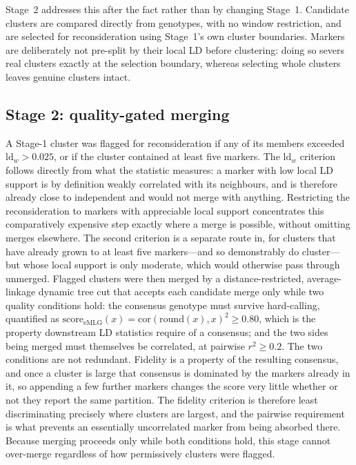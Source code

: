 \documentclass[11pt]{article}
\newcommand{\rsq}{\ensuremath{r^{2}}}
\begin{document}
Stage~2 addresses this after the fact rather than by changing Stage~1. Candidate
clusters are compared directly from genotypes, with no window restriction, and
are selected for reconsideration using Stage~1's own cluster boundaries. Markers
are deliberately not pre-split by their local LD before clustering: doing so
severs real clusters exactly at the selection boundary, whereas selecting whole
clusters leaves genuine clusters intact.

\subsection{Stage 2: quality-gated merging}
A Stage-1 cluster was flagged for reconsideration if any of its members exceeded
$\mathrm{ld}_w > 0.025$, or if the cluster contained at least five markers. The
$\mathrm{ld}_w$ criterion follows directly from what the statistic measures: a
marker with low local LD support is by definition weakly correlated with its
neighbours, and is therefore already close to independent and would not merge
with anything. Restricting the reconsideration to markers with appreciable local
support concentrates this comparatively expensive step exactly where a merge is
possible, without omitting merges elsewhere. The second criterion is a separate
route in, for clusters that have already grown to at least five markers---and so
demonstrably do cluster---but whose local support is only moderate, which would
otherwise pass through unmerged. Flagged clusters were
then merged by a distance-restricted, average-linkage dynamic tree cut that
accepts each candidate merge only while two quality conditions hold: the
consensus genotype must survive hard-calling, quantified as
$\mathrm{score}_{\mathrm{eMLG}}(x) = \mathrm{cor}(\mathrm{round}(x),x)^2 \ge
0.80$, which is the property downstream LD statistics require of a consensus;
and the two sides being merged must themselves be correlated, at pairwise
$\rsq \ge 0.2$. The two conditions are not redundant. Fidelity is a property of
the resulting consensus, and once a cluster is large that consensus is dominated
by the markers already in it, so appending a few further markers changes the
score very little whether or not they report the same partition. The fidelity
criterion is therefore least discriminating precisely where clusters are
largest, and the pairwise requirement is what prevents an essentially
uncorrelated marker from being absorbed there. Because merging proceeds only
while both conditions hold, this stage cannot over-merge regardless of how
permissively clusters were flagged.
\end{document}
